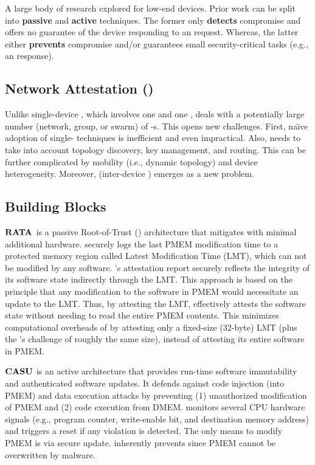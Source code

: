 A large body of research 
\cite{vrased,noorman2013sancus,smart,nunes2020apex,rata,casu,jakkamsetti2023caveat,
aldoseri2023symbolic,wang2023ari,evtyushkin2014iso,ghaeini2019patt,sehatbakhsh2019emma,
feng2021scalable} explored \ra for low-end devices. Prior work can be split into {\bf passive} and 
{\bf active} techniques.
The former only {\bf detects} compromise and offers no guarantee of the device responding to an 
\ra request. Whereas, the latter either {\bf prevents} compromise and/or 
guarantees small security-critical tasks (e.g., an \ra response).

\subsection{Network Attestation (\sa)}
%
Unlike single-device \ra, which involves one \vrf and one \prv, \sa deals with a potentially
large number (network, group, or swarm) of \prv-s. This opens new challenges.
First, na\"{\i}ve adoption of single-\prv{} \ra techniques is inefficient and even impractical.
Also, \sa needs to take into account topology discovery, key management, and routing. This can 
be further complicated by mobility (i.e., dynamic topology) and device heterogeneity.
Moreover, \toctousa (inter-device \toctou) emerges as a new problem.


\subsection{Building Blocks} 
%
\noindent
{\bf $\boldsymbol{{{\rm RATA}}}$ \cite{rata}} is a passive Root-of-Trust (\rot) architecture that 
mitigates \toctoura with minimal additional hardware. \rata securely logs the last PMEM 
modification time to a protected memory region called Latest Modification Time (LMT), 
which can not be modified by any software. 
\prv's attestation report securely reflects the integrity of its software state indirectly 
through the LMT. This approach is based on the principle that any modification to the 
software in PMEM would necessitate an update to the LMT. Thus, by attesting the LMT, \rata 
effectively attests the software state without needing to read the entire PMEM contents. 
This minimizes \ra computational overheads of \prv by attesting only 
a fixed-size ($32$-byte) LMT (plus the \vrf's challenge of roughly the same size), instead 
of attesting its entire software in PMEM.

\noindent
{\bf $\boldsymbol{{{\rm CASU}}}$ \cite{casu}} is an active \rot architecture 
that provides run-time software immutability and authenticated software updates. 
It defends against code injection (into PMEM) and data execution attacks by preventing 
(1) unauthorized modification of PMEM and (2) code execution from DMEM.
\casu monitors several CPU hardware signals (e.g., program counter, write-enable bit, and 
destination memory address) and triggers a reset if any violation is detected.
The only means to modify PMEM is via secure update.
\casu inherently prevents \toctoura since PMEM cannot be overwritten by malware.

